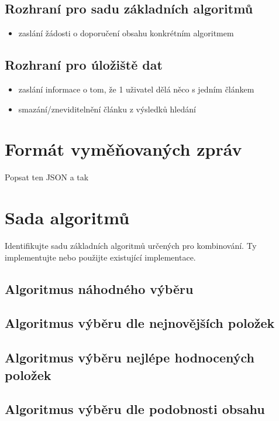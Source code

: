 \documentclass[thesis=M,czech]{FITthesis}[2014/05/07]
\begin{document}
\subsection{Rozhraní pro sadu základních algoritmů}

\begin{itemize}
	\item zaslání žádosti o doporučení obsahu konkrétním algoritmem
\end{itemize}

\subsection{Rozhraní pro úložiště dat}

\begin{itemize}
\item zaslání informace o tom, že 1 uživatel dělá něco s jedním článkem
	\item smazání/zneviditelnění článku z výsledků hledání
\end{itemize}

\section{Formát vyměňovaných zpráv}

Popsat ten JSON a tak
			
\section{Sada algoritmů}
Identifikujte sadu základních algoritmů určených pro kombinování. Ty implementujte nebo použijte existující implementace.	

\subsection{Algoritmus náhodného výběru}

\subsection{Algoritmus výběru dle nejnovějších položek}

\subsection{Algoritmus výběru nejlépe hodnocených položek}

\subsection{Algoritmus výběru dle podobnosti obsahu}
\end{document}
